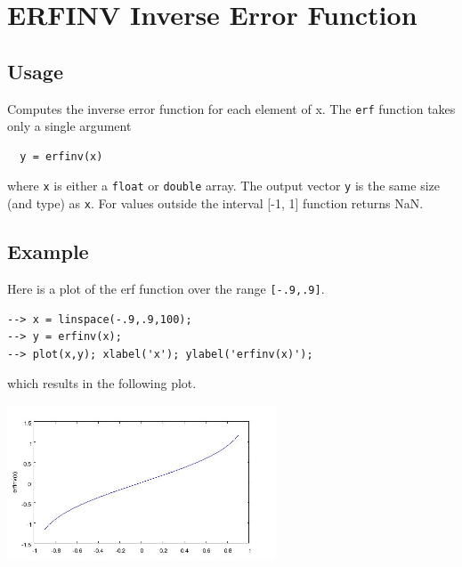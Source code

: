 \section{ERFINV Inverse Error Function}

\subsection{Usage}

Computes the inverse error function for each element of x.  The \verb|erf|
function takes only a single argument
\begin{verbatim}
  y = erfinv(x)
\end{verbatim}
where \verb|x| is either a \verb|float| or \verb|double| array.  The output
vector \verb|y| is the same size (and type) as \verb|x|. For values outside the interval [-1, 1] function returns NaN.
\subsection{Example}

Here is a plot of the erf function over the range \verb|[-.9,.9]|.
\begin{verbatim}
--> x = linspace(-.9,.9,100);
--> y = erfinv(x);
--> plot(x,y); xlabel('x'); ylabel('erfinv(x)');
\end{verbatim}
which results in the following plot.


\centerline{\includegraphics[width=8cm]{erfinv1}}

